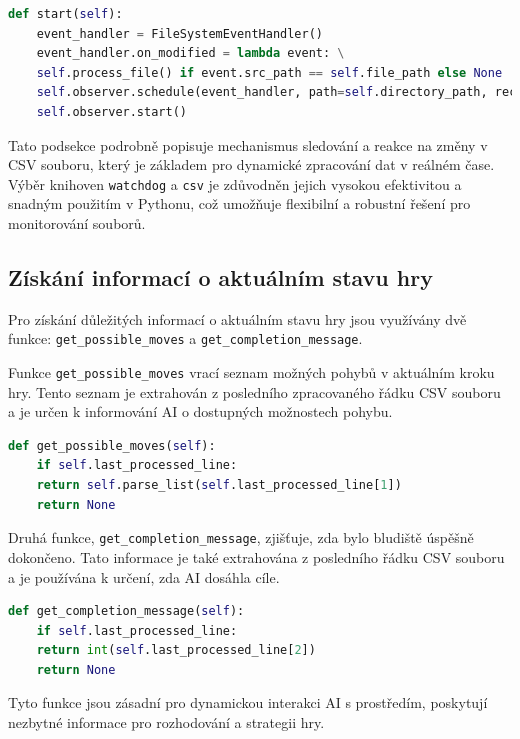 \documentclass[12pt, a4paper,
twoside,        %
openright
]{report}
\begin{document}
\begin{lstlisting}[language=Python, caption={Sledovani a reakce na zmeny souboru}]
	def start(self):
	event_handler = FileSystemEventHandler()
	event_handler.on_modified = lambda event: \
	self.process_file() if event.src_path == self.file_path else None
	self.observer.schedule(event_handler, path=self.directory_path, recursive=False)
	self.observer.start()
\end{lstlisting}

Tato podsekce podrobně popisuje mechanismus sledování a reakce na změny v CSV souboru, který je základem pro dynamické zpracování dat v reálném čase. Výběr knihoven \texttt{watchdog} a \texttt{csv} je zdůvodněn jejich vysokou efektivitou a snadným použitím v Pythonu, což umožňuje flexibilní a robustní řešení pro monitorování souborů.

\subsection{Získání informací o aktuálním stavu hry}
Pro získání důležitých informací o aktuálním stavu hry jsou využívány dvě funkce: \texttt{get\_possible\_moves} a \texttt{get\_completion\_message}.

Funkce \texttt{get\_possible\_moves} vrací seznam možných pohybů v aktuálním kroku hry. Tento seznam je extrahován z posledního zpracovaného řádku CSV souboru a je určen k informování AI o dostupných možnostech pohybu.

\begin{lstlisting}[language=Python, caption={Získání seznamu možných pohybů}]
	def get_possible_moves(self):
	if self.last_processed_line:
	return self.parse_list(self.last_processed_line[1])
	return None
\end{lstlisting}
\newpage
Druhá funkce, \texttt{get\_completion\_message}, zjišťuje, zda bylo bludiště úspěšně dokončeno. Tato informace je také extrahována z posledního řádku CSV souboru a je používána k určení, zda AI dosáhla cíle.

\begin{lstlisting}[language=Python, caption={Zjištění dokončení bludiště}]
	def get_completion_message(self):
	if self.last_processed_line:
	return int(self.last_processed_line[2])
	return None
\end{lstlisting}

Tyto funkce jsou zásadní pro dynamickou interakci AI s prostředím, poskytují nezbytné informace pro rozhodování a strategii hry.
\end{document}
